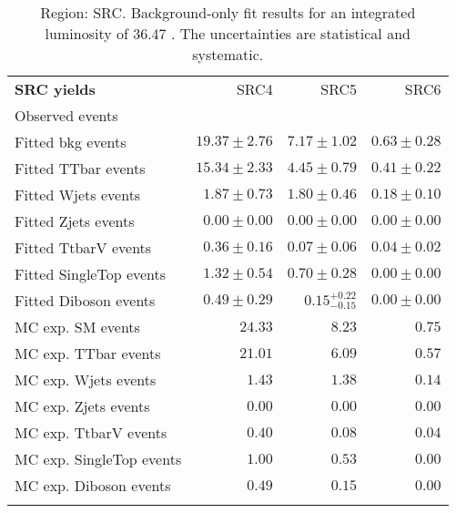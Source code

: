 

\begin{table}
\begin{center}
\setlength{\tabcolsep}{0.0pc}
{\small
\begin{tabular*}{\textwidth}{@{\extracolsep{\fill}}lrrr}
\noalign{\smallskip}\hline\noalign{\smallskip}
{\bf SRC yields}           & SRC4            & SRC5            & SRC6              \\[-0.05cm]
\noalign{\smallskip}\hline\noalign{\smallskip}
Observed events                \\
\noalign{\smallskip}\hline\noalign{\smallskip}
Fitted bkg events         & $19.37 \pm 2.76$          & $7.17 \pm 1.02$          & $0.63 \pm 0.28$              \\
\noalign{\smallskip}\hline\noalign{\smallskip}
        Fitted TTbar events         & $15.34 \pm 2.33$          & $4.45 \pm 0.79$          & $0.41 \pm 0.22$              \\
        Fitted Wjets events         & $1.87 \pm 0.73$          & $1.80 \pm 0.46$          & $0.18 \pm 0.10$              \\
        Fitted Zjets events         & $0.00 \pm 0.00$          & $0.00 \pm 0.00$          & $0.00 \pm 0.00$              \\
        Fitted TtbarV events         & $0.36 \pm 0.16$          & $0.07 \pm 0.06$          & $0.04 \pm 0.02$              \\
        Fitted SingleTop events         & $1.32 \pm 0.54$          & $0.70 \pm 0.28$          & $0.00 \pm 0.00$              \\
        Fitted Diboson events         & $0.49 \pm 0.29$          & $0.15_{-0.15}^{+0.22}$          & $0.00 \pm 0.00$              \\
 \noalign{\smallskip}\hline\noalign{\smallskip}
MC exp. SM events              & $24.33$          & $8.23$          & $0.75$              \\
\noalign{\smallskip}\hline\noalign{\smallskip}
        MC exp. TTbar events         & $21.01$          & $6.09$          & $0.57$              \\
        MC exp. Wjets events         & $1.43$          & $1.38$          & $0.14$              \\
        MC exp. Zjets events         & $0.00$          & $0.00$          & $0.00$              \\
        MC exp. TtbarV events         & $0.40$          & $0.08$          & $0.04$              \\
        MC exp. SingleTop events         & $1.00$          & $0.53$          & $0.00$              \\
        MC exp. Diboson events         & $0.49$          & $0.15$          & $0.00$              \\
\noalign{\smallskip}\hline\noalign{\smallskip}
\end{tabular*}
}
\end{center}
\caption{Region: SRC. Background-only fit results for an integrated luminosity of 36.47 \ifb. The uncertainties are statistical and systematic.
}
\label{table.bkgonly.SRC4to6}
\end{table}
%
